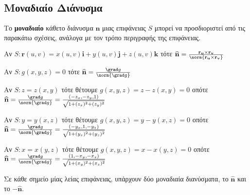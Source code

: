 \documentclass[a4paper,table]{report}
\begin{document}

\setcounter{chapter}{1}

\begin{center}
\minibox{\large \bfseries \textcolor{Col1}{Στοιχεία Θεωρίας για το Επιφανειακό
Ολοκλήρωμα}}
\end{center}

\vspace{\baselineskip}



\subsection*{Μοναδιαίο Διάνυσμα}

\begin{dfn}
  Το \textbf{μοναδιαίο} κάθετο διάνυσμα $ \mathbf{n} $ μιας επιφάνειας $ S $ μπορεί να 
  προσδιοριστεί από τις παρακάτω σχέσεις, ανάλογα με τον τρόπο περιγραφής της επιφάνειας.
  \begin{myitemize}
    \item Αν $ S\colon \mathbf{r}(u,v) = x(u,v)\mathbf{i}+y(u,v)\mathbf{j}+
      z(u,v)\mathbf{k} $ τότε $ \mathbf{\widehat{n}} = \frac{\mathbf{r_{u}} \times
      \mathbf{r_{v}}}{\norm{\mathbf{r_{u}} \times \mathbf{r_{v}}}} $ 
    \item Αν $ S\colon g(x,y,z)=0 $ τότε $ \mathbf{\widehat{n}} = 
      \frac{\grad g}{\norm{\grad g}} $
    \item Αν $ S\colon z=z(x,y) $ τότε θέτουμε $ g(x,y,z)=z-z(x,y)=0 $ οπότε
      $ \mathbf{\widehat{n}} = \frac{\grad g}{\norm{\grad g}} = 
      \frac{(-z_{x},-z_{y},1)}{\sqrt{1+(z_{x})^{2}+(z_{y})^{2}}} $ 
    \item Αν $ S\colon y=y(x,z) $ τότε θέτουμε $ g(x,y,z)=y-y(x,z)=0 $ οπότε
      $ \mathbf{\widehat{n}} = \frac{\grad g}{\norm{\grad g}} = 
      \frac{(-y_{x},1,-y_{z})}{\sqrt{1+(y_{x})^{2}+(y_{z})^{2}}} $ 
    \item Αν $ S\colon x=x(y,z) $ τότε θέτουμε $ g(x,y,z)=x-x(y,z)=0 $ οπότε
      $ \mathbf{\widehat{n}} = \frac{\grad g}{\norm{\grad g}} = 
      \frac{(1,-x_{y},-x_{z})}{\sqrt{1+(x_{y})^{2}+(x_{z})^{2}}} $ 
  \end{myitemize}
\end{dfn}

\begin{rem}
  Σε κάθε σημείο μίας λείας επιφάνειας, υπάρχουν δύο μοναδιαία διανύσματα, το $
  \mathbf{\widehat{n}} $ και το $ -\mathbf{\widehat{n}} $.  
\end{rem}
\end{document}
